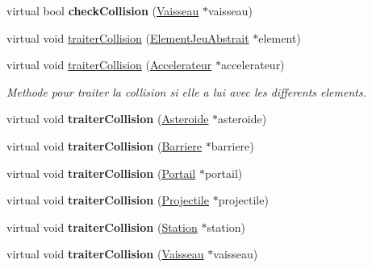 \begin{DoxyCompactItemize}
\item 
\hypertarget{class_position_depart_a09b672c6476f832182452f371ee2e002}{virtual bool {\bfseries check\-Collision} (\hyperlink{class_vaisseau}{Vaisseau} $\ast$vaisseau)}\label{class_position_depart_a09b672c6476f832182452f371ee2e002}

\item 
virtual void \hyperlink{class_position_depart_a0675f0c17e1a35da105bdb44cf899b10}{traiter\-Collision} (\hyperlink{class_element_jeu_abstrait}{Element\-Jeu\-Abstrait} $\ast$element)
\item 
\hypertarget{class_position_depart_a95ca347cf3fb6aaed0c10631946e3f12}{virtual void \hyperlink{class_position_depart_a95ca347cf3fb6aaed0c10631946e3f12}{traiter\-Collision} (\hyperlink{class_accelerateur}{Accelerateur} $\ast$accelerateur)}\label{class_position_depart_a95ca347cf3fb6aaed0c10631946e3f12}

\begin{DoxyCompactList}\small\item\em Methode pour traiter la collision si elle a lui avec les differents elements. \end{DoxyCompactList}\item 
\hypertarget{class_position_depart_af159bc9bf4624373bf5bb3f631c3b117}{virtual void {\bfseries traiter\-Collision} (\hyperlink{class_asteroide}{Asteroide} $\ast$asteroide)}\label{class_position_depart_af159bc9bf4624373bf5bb3f631c3b117}

\item 
\hypertarget{class_position_depart_afb274942936691d5ed53b52c5719538a}{virtual void {\bfseries traiter\-Collision} (\hyperlink{class_barriere}{Barriere} $\ast$barriere)}\label{class_position_depart_afb274942936691d5ed53b52c5719538a}

\item 
\hypertarget{class_position_depart_adab24313dffd3f9d01d6667002d0a140}{virtual void {\bfseries traiter\-Collision} (\hyperlink{class_portail}{Portail} $\ast$portail)}\label{class_position_depart_adab24313dffd3f9d01d6667002d0a140}

\item 
\hypertarget{class_position_depart_a01b7a34c56e40f65731ee41a8b18784c}{virtual void {\bfseries traiter\-Collision} (\hyperlink{class_projectile}{Projectile} $\ast$projectile)}\label{class_position_depart_a01b7a34c56e40f65731ee41a8b18784c}

\item 
\hypertarget{class_position_depart_ac2c7bce72958d868647ec76cb63db718}{virtual void {\bfseries traiter\-Collision} (\hyperlink{class_station}{Station} $\ast$station)}\label{class_position_depart_ac2c7bce72958d868647ec76cb63db718}

\item 
\hypertarget{class_position_depart_a749a7a6527729c5115f66384a2ac605a}{virtual void {\bfseries traiter\-Collision} (\hyperlink{class_vaisseau}{Vaisseau} $\ast$vaisseau)}\label{class_position_depart_a749a7a6527729c5115f66384a2ac605a}

\end{DoxyCompactItemize}
